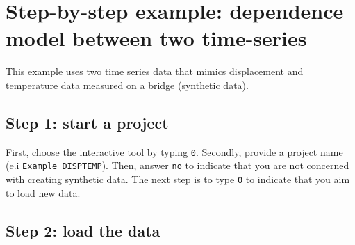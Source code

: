 \section{Step-by-step example: dependence model between two time-series}
\label{S:ExampleDispTemp}


This example uses two time series data that mimics displacement and temperature data measured on a bridge (synthetic data). 

\subsection{Step 1: start a project}

First, choose the interactive tool by typing \colorbox{light-gray}{\lstinline[basicstyle = \mlttfamily \small, backgroundcolor = \color{light-gray}]!0!}.
Secondly, provide a project name (e.i \lstinline[basicstyle = \mlttfamily \small, backgroundcolor = \color{light-gray}]!Example_DISPTEMP!).
Then, answer \colorbox{light-gray}{\lstinline[basicstyle = \mlttfamily \small, backgroundcolor = \color{light-gray}]!no!} to indicate that you are not concerned with creating synthetic data.
The next step is to type \colorbox{light-gray}{\lstinline[basicstyle = \mlttfamily \small, backgroundcolor = \color{light-gray}]!0!} to indicate that you aim to load new data.

\subsection{Step 2: load the data}

